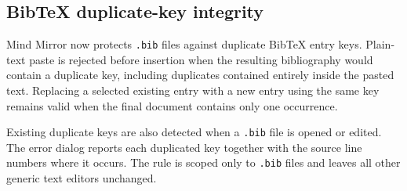 \documentclass[a4paper]{article}
\title{}
\date{}
\author{Mohammad Rahmani}
\begin{document}
   \maketitle

   \begin{preview}
      \section{BibTeX duplicate-key integrity}
      Mind Mirror now protects \texttt{.bib} files against duplicate BibTeX entry keys. Plain-text paste is rejected before insertion when the resulting bibliography would contain a duplicate key, including duplicates contained entirely inside the pasted text. Replacing a selected existing entry with a new entry using the same key remains valid when the final document contains only one occurrence.

      Existing duplicate keys are also detected when a \texttt{.bib} file is opened or edited. The error dialog reports each duplicated key together with the source line numbers where it occurs. The rule is scoped only to \texttt{.bib} files and leaves all other generic text editors unchanged.
   \end{preview}

   
   
\end{document}
